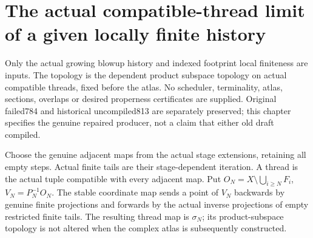 \section{The actual compatible-thread limit of a given locally finite history}
\label{sec:actual-thread-lf-limit}

Only the actual growing blowup history and indexed footprint local finiteness
are inputs. The topology is the dependent product subspace topology on actual
compatible threads, fixed before the atlas. No scheduler, terminality, atlas,
sections, overlaps or desired properness certificates are supplied. Original
failed784 and historical uncompiled813 are separately preserved; this chapter
specifies the genuine repaired producer, not a claim that either old draft compiled.

\begin{definition}
\label{hir:actual-thread-lf-data}
\leanok
{}
Choose the genuine adjacent maps from the actual stage extensions, retaining
all empty steps. Actual finite tails are their stage-dependent iteration.
A thread is the actual tuple compatible with every adjacent map. Put
$O_N=X\setminus\bigcup_{i\geq N}F_i$, $V_N=P_N^{-1}O_N$. The stable coordinate
map sends a point of $V_N$ backwards by genuine finite projections and forwards
by the actual inverse projections of empty restricted finite tails. The
resulting thread map is $\sigma_N$; its product-subspace topology is not altered
when the complex atlas is subsequently constructed.
\end{definition}

